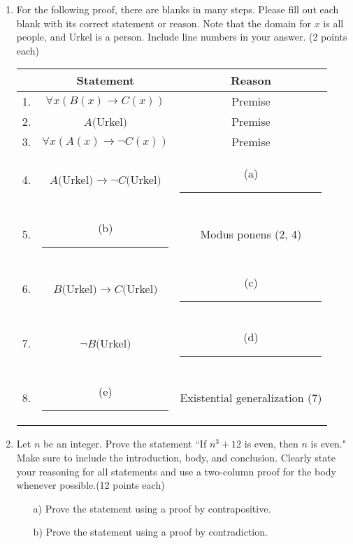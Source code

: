 \documentclass{article}
\begin{document}
\begin{enumerate}
    \iffalse

    
    Let $P(x) = \text{``x has dropped out from Georgia Tech"}$
    
    Let $Q(x) = \text{``$x$ knows how to write proofs"}$
    
    Let $R(x) = \text{``$x$ can get a high paying job"}$
    

    \vspace{1.5mm}
    ``Sarthak, a Georgia Tech dropout, knows how to write proofs. Everyone who can write proofs can get a high-paying job. Therefore, there exists a person who has dropped out from Georgia Tech who can get a high paying job.”
    
        
    Using the appropriate propositional variables and connectives, check the validity of the argument below. You should properly label the rule of inference you use on each step along with the lines to which you apply it.
    \fi
    
    \newpage
    \item{For the following proof, there are blanks in many steps. Please fill out each blank with its correct statement or reason. Note that the domain for $x$ is all people, and Urkel is a person. Include line numbers in your answer. \hfill\hfill \color{blue}(2 points each)}\
    \begin{center}
    \renewcommand{\arraystretch}{2}
    \begin{tabular}{rc|c}
        & \textbf{Statement} & \textbf{Reason} \\\hline
        1. & $\forall x (B(x) \to C(x))$ & Premise \\
        2. & $A($Urkel$)$ & Premise  \\
        3. & $\forall x (A(x) \to \lnot C(x))$ & Premise\\
        4. & $A($Urkel$) \to \lnot C($Urkel$)$ & (a) \rule{4cm}{0.15mm}  \\
        5. & (b) \rule{4cm}{0.15mm}  & Modus ponens (2, 4)\\
        6. & $B($Urkel$) \to C($Urkel$)$ & (c) \rule{4cm}{0.15mm}\\
        7. & $\lnot B($Urkel$)$ & (d) \rule{4cm}{0.15mm}\\
        8. & (e) \rule{4cm}{0.15mm} & Existential generalization (7)
    \end{tabular}
    \end{center}
    

    \item{Let $n$ be an integer. Prove the statement ``If $n^3 + 12$ is even, then $n$ is even." Make sure to include the introduction, body, and conclusion. Clearly state your reasoning for all statements and use a two-column proof for the body whenever possible.\hfill\hfill \color{blue}(12 points each)}
    \begin{enumerate}
        \item[a)] Prove the statement using a proof by contrapositive.
        \item[b)] Prove the statement using a proof by contradiction.
    \end{enumerate}
    

\end{enumerate}
\end{document}
